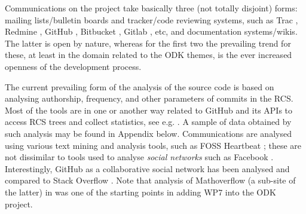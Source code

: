 \documentclass{deliverablereport}
\begin{document}
Communications on the project take basically three (not totally disjoint)
forms: mailing lists/bulletin
boards and tracker/code reviewing systems,
such as Trac \cite{wp7:trac}, Redmine \cite{wp7:redmine},
GitHub \cite{wp7:github},
Bitbucket \cite{wp7:bitbucket}, Gitlab \cite{wp7:gitlab},
etc, and documentation
systems/wikis. The latter is open by nature, whereas for the first two
the prevailing trend for these, at least in the domain related to the
ODK themes, is the ever increased
openness of the development process.

The current prevailing form of the analysis of the source code is based on
analysing authorship, frequency, and other parameters of commits in the RCS.
Most of the tools are in one or another way related to GitHub and its APIs to
access RCS trees and collect statistics, see e.g. \cite{wp7:arfonshapeoss}.
A sample of data obtained by such analysis may be found in Appendix below.
Communications are analysed using various text mining and analysis tools, such
as FOSS Heartbeat \cite{wp7:fossheartbeat}; these are not dissimilar to tools
used to analyse {\em social networks} such as Facebook
\cite{wp7:russell2013mining}.  Interestingly, GitHub as a collaborative social
network has been analysed \cite{wp7:githubandsof, DBLP:journals/corr/LimaRM14,
DBLP:journals/corr/VasilescuSWSB15, wp7:Kalliamvakou:2014:PPM:2597073.2597074}
and compared to Stack Overflow \cite{wp7:stackoverflow}. Note that analysis of
Mathoverflow (a sub-site of the latter) in \cite{MarPea:wmtapm13} was one of
the starting points in adding WP7 into the ODK project.
\end{document}
